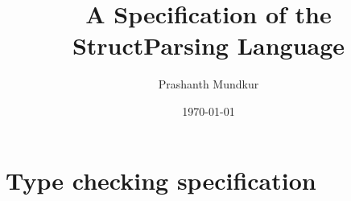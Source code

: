 \documentclass{article}
\begin{document}
\title{A Specification of the StructParsing Language}
\author{Prashanth Mundkur}
\date{\today} \maketitle

\newcommand{\DDC}{$\mathrm{DDC}^\alpha$\xspace}
\newcommand{\OCaml}{\textrm{OCaml}\xspace}

\section{Type checking specification}



\ottall



\end{document}

